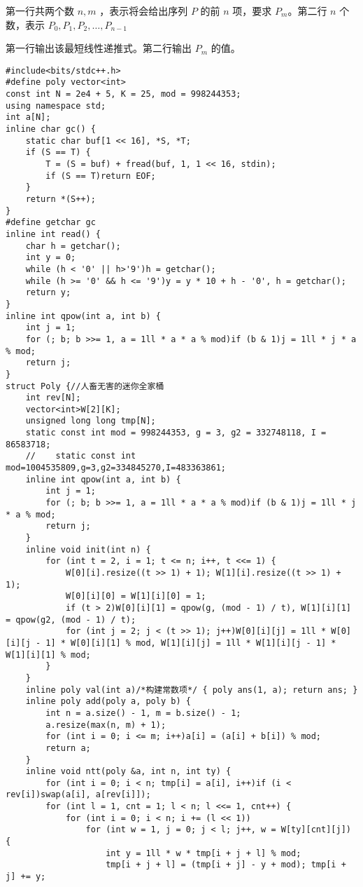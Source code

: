 \par \noindent 第一行共两个数 $n,m$ ，表示将会给出序列 $P$ 的前 $n$ 项，要求 $P_m$。第二行 $n$ 个数，表示 $P_0,P_1,P_2,\ldots,P_{n-1}$
~\\
\par \noindent 第一行输出该最短线性递推式。第二行输出 $P_m$ 的值。
\begin{verbatim}
#include<bits/stdc++.h>
#define poly vector<int>
const int N = 2e4 + 5, K = 25, mod = 998244353;
using namespace std;
int a[N];
inline char gc() {
    static char buf[1 << 16], *S, *T;
    if (S == T) {
        T = (S = buf) + fread(buf, 1, 1 << 16, stdin);
        if (S == T)return EOF;
    }
    return *(S++);
}
#define getchar gc
inline int read() {
    char h = getchar();
    int y = 0;
    while (h < '0' || h>'9')h = getchar();
    while (h >= '0' && h <= '9')y = y * 10 + h - '0', h = getchar();
    return y;
}
inline int qpow(int a, int b) {
    int j = 1;
    for (; b; b >>= 1, a = 1ll * a * a % mod)if (b & 1)j = 1ll * j * a % mod;
    return j;
}
struct Poly {//人畜无害的迷你全家桶 
    int rev[N];
    vector<int>W[2][K];
    unsigned long long tmp[N];
    static const int mod = 998244353, g = 3, g2 = 332748118, I = 86583718;
    //    static const int mod=1004535809,g=3,g2=334845270,I=483363861;
    inline int qpow(int a, int b) {
        int j = 1;
        for (; b; b >>= 1, a = 1ll * a * a % mod)if (b & 1)j = 1ll * j * a % mod;
        return j;
    }
    inline void init(int n) {
        for (int t = 2, i = 1; t <= n; i++, t <<= 1) {
            W[0][i].resize((t >> 1) + 1); W[1][i].resize((t >> 1) + 1);
            W[0][i][0] = W[1][i][0] = 1;
            if (t > 2)W[0][i][1] = qpow(g, (mod - 1) / t), W[1][i][1] = qpow(g2, (mod - 1) / t);
            for (int j = 2; j < (t >> 1); j++)W[0][i][j] = 1ll * W[0][i][j - 1] * W[0][i][1] % mod, W[1][i][j] = 1ll * W[1][i][j - 1] * W[1][i][1] % mod;
        }
    }
    inline poly val(int a)/*构建常数项*/ { poly ans(1, a); return ans; }
    inline poly add(poly a, poly b) {
        int n = a.size() - 1, m = b.size() - 1;
        a.resize(max(n, m) + 1);
        for (int i = 0; i <= m; i++)a[i] = (a[i] + b[i]) % mod;
        return a;
    }
    inline void ntt(poly &a, int n, int ty) {
        for (int i = 0; i < n; tmp[i] = a[i], i++)if (i < rev[i])swap(a[i], a[rev[i]]);
        for (int l = 1, cnt = 1; l < n; l <<= 1, cnt++) {
            for (int i = 0; i < n; i += (l << 1))
                for (int w = 1, j = 0; j < l; j++, w = W[ty][cnt][j]) {
                    int y = 1ll * w * tmp[i + j + l] % mod;
                    tmp[i + j + l] = (tmp[i + j] - y + mod); tmp[i + j] += y;

\end{verbatim}
